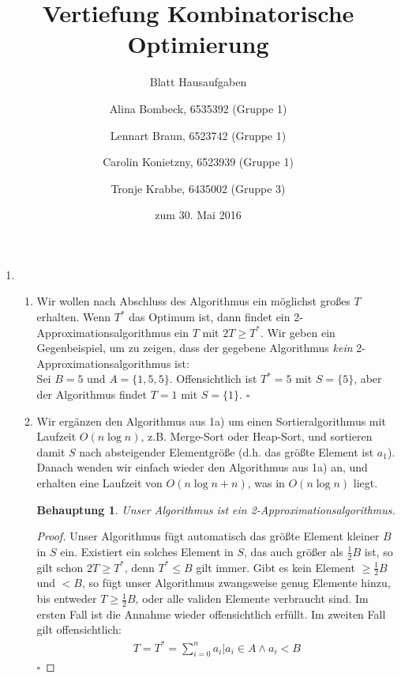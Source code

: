 \documentclass[a4paper]{scrartcl}
\title{Vertiefung Kombinatorische Optimierung}
\subtitle{Blatt {\blattnr} Hausaufgaben}
\author{%
    Alina Bombeck, 6535392 (Gruppe 1) \and
    Lennart Braun, 6523742 (Gruppe 1) \and
    Carolin Konietzny, 6523939 (Gruppe 1) \and
    Tronje Krabbe, 6435002 (Gruppe 3)
}
\date{zum 30. Mai 2016}
\newtheorem*{proposition}{Behauptung}
\begin{document}
\maketitle


\begin{enumerate}[label=\bfseries \arabic*.]
\item %
\begin{enumerate}
    \item %
        Wir wollen nach Abschluss des Algorithmus ein möglichst großes $T$ erhalten.
        Wenn $T^*$ das Optimum ist, dann findet ein 2-Approximationsalgorithmus
        ein $T$ mit $2T \geq T^*$.
        Wir geben ein Gegenbeispiel, um zu zeigen, dass der gegebene Algorithmus
        \textit{kein} 2-Approximationsalgorithmus ist:\\
        Sei $B = 5$ und $A = \{1, 5, 5\}$. Offensichtlich ist $T^* = 5$
        mit $S= \{5\}$, aber der Algorithmus findet $T = 1$ mit $S = \{1\}$.
        $\square$
    \item %
        Wir ergänzen den Algorithmus aus 1a) um einen Sortieralgorithmus
        mit Laufzeit $O(n \log n)$, z.B. Merge-Sort oder Heap-Sort, und
        sortieren damit $S$ nach absteigender Elementgröße (d.h. das größte
        Element ist $a_1$).
        Danach wenden wir einfach wieder den Algorithmus aus 1a) an, und erhalten
        eine Laufzeit von $O(n \log n + n)$, was in $O(n \log n)$ liegt.
        \\
        \begin{proposition}
        Unser Algorithmus ist ein 2-Approximationsalgorithmus.
        \end{proposition}
        \begin{proof}
            Unser Algorithmus fügt automatisch das größte Element kleiner $B$ in $S$ ein.
            Existiert ein solches Element in $S$, das auch größer als $\frac{1}{2}B$
            ist, so gilt schon $2T \geq T^*$, denn $T^* \leq B$ gilt immer.
            Gibt es kein Element $\geq \frac{1}{2}B$ und $<B$, so fügt unser Algorithmus
            zwangsweise genug Elemente hinzu, bis entweder $T \geq \frac{1}{2}B$, oder alle
            validen Elemente verbraucht sind. Im ersten Fall ist die Annahme wieder offensichtlich erfüllt.
            Im zweiten Fall gilt offensichtlich:
            \begin{align*}
                T = T^* = \sum_{i=0}^{n}a_i | a_i \in A \wedge a_i < B
            \end{align*}
            $\square$
        \end{proof}


\end{enumerate}
\end{enumerate}
\end{document}
